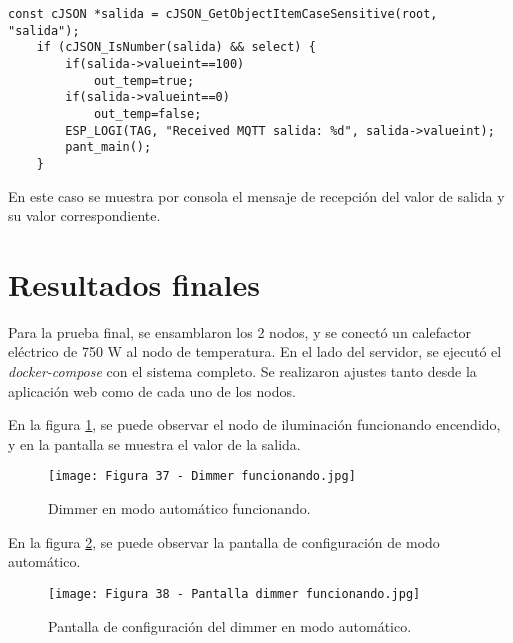 
\begin{lstlisting}[caption={Muestra por consola de la terminal ESP-IDF.}, label={lst:dispositivo}]
const cJSON *salida = cJSON_GetObjectItemCaseSensitive(root, "salida");
    if (cJSON_IsNumber(salida) && select) {
        if(salida->valueint==100)
            out_temp=true;
        if(salida->valueint==0)
            out_temp=false;
        ESP_LOGI(TAG, "Received MQTT salida: %d", salida->valueint);
        pant_main();
    }
\end{lstlisting}

En este caso se muestra por consola el mensaje de recepción del valor de salida y su valor correspondiente.

\section{Resultados finales}

Para la prueba final, se ensamblaron los 2 nodos, y se conectó un calefactor eléctrico de 750 W al nodo de temperatura. En el lado del servidor, se ejecutó el \textit{docker-compose} con el sistema completo. Se realizaron ajustes tanto desde la aplicación web como de cada uno de los nodos.

En la figura \ref{fig:37}, se puede observar el nodo de iluminación funcionando encendido, y en la pantalla se muestra el valor de la salida.

\begin{figure}[h]
\centering
\texttt{[image: Figura 37 - Dimmer funcionando.jpg]}
\caption[Dimmer funciona]{Dimmer en modo automático funcionando.}
\label{fig:37}
\end{figure}

En la figura \ref{fig:38}, se puede observar la pantalla de configuración de modo automático.

\begin{figure}[h]
\centering
\texttt{[image: Figura 38 - Pantalla dimmer funcionando.jpg]}
\caption[Pantalla dimmer funciona]{Pantalla de configuración del dimmer en modo automático.}
\label{fig:38}
\end{figure}

